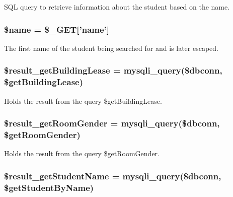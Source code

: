 \-S\-Q\-L query to retrieve information about the student based on the name. \hypertarget{getRoomByName_8php_ab2fc40d43824ea3e1ce5d86dee0d763b}{
\subsubsection[{\$name}]{\setlength{\rightskip}{0pt plus 5cm}\$name = \$\-\_\-\-G\-E\-T\mbox{[}'name'\mbox{]}}}\label{getRoomByName_8php_ab2fc40d43824ea3e1ce5d86dee0d763b}
\-The first name of the student being searched for and is later escaped. \hypertarget{getRoomByName_8php_a85b7461a0b78e5b681f1c7c5c6b4654c}{
\subsubsection[{\$result\-\_\-get\-Building\-Lease}]{\setlength{\rightskip}{0pt plus 5cm}\$result\-\_\-get\-Building\-Lease = mysqli\-\_\-query(\$dbconn, \$get\-Building\-Lease)}}\label{getRoomByName_8php_a85b7461a0b78e5b681f1c7c5c6b4654c}
\-Holds the result from the query \$get\-Building\-Lease. \hypertarget{getRoomByName_8php_a9ce0616f2a54ee7e19e22d0bb7c4c1c7}{
\subsubsection[{\$result\-\_\-get\-Room\-Gender}]{\setlength{\rightskip}{0pt plus 5cm}\$result\-\_\-get\-Room\-Gender = mysqli\-\_\-query(\$dbconn, \$get\-Room\-Gender)}}\label{getRoomByName_8php_a9ce0616f2a54ee7e19e22d0bb7c4c1c7}
\-Holds the result from the query \$get\-Room\-Gender. \hypertarget{getRoomByName_8php_af6869910e8818d12be3041b40f6ddf80}{
\subsubsection[{\$result\-\_\-get\-Student\-Name}]{\setlength{\rightskip}{0pt plus 5cm}\$result\-\_\-get\-Student\-Name = mysqli\-\_\-query(\$dbconn, \$get\-Student\-By\-Name)}}\label{getRoomByName_8php_af6869910e8818d12be3041b40f6ddf80}
